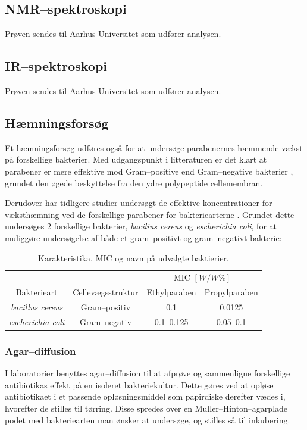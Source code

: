     \subsection{NMR--spektroskopi}
    Prøven sendes til Aarhus Universitet som udfører analysen.

    \subsection{IR--spektroskopi}
    Prøven sendes til Aarhus Universitet som udfører analysen.

    \subsection{Hæmningsforsøg}
    Et hæmningsforsøg udføres også for at undersøge parabenernes hæmmende vækst på forskellige bakterier. Med udgangspunkt i litteraturen er det klart at parabener er mere effektive mod Gram--positive end Gram--negative bakterier \parencite{Joao2021}, grundet den øgede beskyttelse fra den ydre polypeptide cellemembran. 

    Derudover har tidligere studier undersøgt de effektive koncentrationer for væksthæmning ved de forskellige parabener for bakteriearterne \parencite{Wies2019}. Grundet dette undersøges 2 forskellige bakterier, \textit{bacilius cereus} og \textit{escherichia coli}, for at muliggøre undersøgelse af både et gram--positivt og gram--negativt bakterie:
    \begin{table}[H]\centering
        \caption{Karakteristika, MIC og navn på udvalgte baktierier.}
        \begin{tabular}{cccc}
            \toprule
            & & \multicolumn{2}{c}{MIC $\left[\si{W\per W\%}\right]$} \\
            \cmidrule(r){3-4}
            Bakterieart & Cellevægsstruktur & Ethylparaben & Propylparaben \\
            \midrule
            \textit{bacillus cereus} & Gram--positiv & 0.1 & 0.0125 \\
            \textit{escherichia coli} & Gram--negativ & 0.1--0.125 & 0.05--0.1 \\
            \bottomrule
        \end{tabular}
    \end{table}
    
    \subsubsection{Agar--diffusion}
    I laboratorier benyttes agar--diffusion til at afprøve og sammenligne forskellige antibiotikas effekt på en isoleret bakteriekultur. Dette gøres ved at opløse antibiotikaet i et passende opløsningsmiddel som papirdiske derefter vædes i, hvorefter de stilles til tørring. Disse spredes over en Muller--Hinton--agarplade podet med bakteriearten man ønsker at undersøge, og stilles så til inkubering. 

